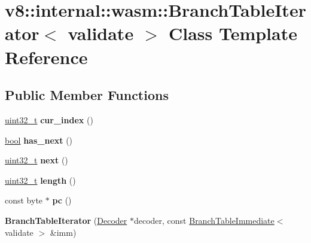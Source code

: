 \hypertarget{classv8_1_1internal_1_1wasm_1_1BranchTableIterator}{}\section{v8\+:\+:internal\+:\+:wasm\+:\+:Branch\+Table\+Iterator$<$ validate $>$ Class Template Reference}
\label{classv8_1_1internal_1_1wasm_1_1BranchTableIterator}
\subsection*{Public Member Functions}
\begin{DoxyCompactItemize}
\item 
\mbox{\label{classv8_1_1internal_1_1wasm_1_1BranchTableIterator_ae504f1f6c86f2a2dd23d9ee2f913e0af}} 
\mbox{\hyperlink{classuint32__t}{uint32\+\_\+t}} {\bfseries cur\+\_\+index} ()
\item 
\mbox{\label{classv8_1_1internal_1_1wasm_1_1BranchTableIterator_a58d59728cd84e70862e748f9054275d5}} 
\mbox{\hyperlink{classbool}{bool}} {\bfseries has\+\_\+next} ()
\item 
\mbox{\label{classv8_1_1internal_1_1wasm_1_1BranchTableIterator_a3d5ec935a540c9e1662feee0f70ad314}} 
\mbox{\hyperlink{classuint32__t}{uint32\+\_\+t}} {\bfseries next} ()
\item 
\mbox{\label{classv8_1_1internal_1_1wasm_1_1BranchTableIterator_a100871a7b01ac178e68fcb971dea6d6c}} 
\mbox{\hyperlink{classuint32__t}{uint32\+\_\+t}} {\bfseries length} ()
\item 
\mbox{\label{classv8_1_1internal_1_1wasm_1_1BranchTableIterator_a14479563dbbb8e415857dacf3855077c}} 
const byte $\ast$ {\bfseries pc} ()
\item 
\mbox{\label{classv8_1_1internal_1_1wasm_1_1BranchTableIterator_a8eb6ef99e804befdf179261a1a13cfbb}} 
{\bfseries Branch\+Table\+Iterator} (\mbox{\hyperlink{classv8_1_1internal_1_1wasm_1_1Decoder}{Decoder}} $\ast$decoder, const \mbox{\hyperlink{structv8_1_1internal_1_1wasm_1_1BranchTableImmediate}{Branch\+Table\+Immediate}}$<$ validate $>$ \&imm)
\end{DoxyCompactItemize}


